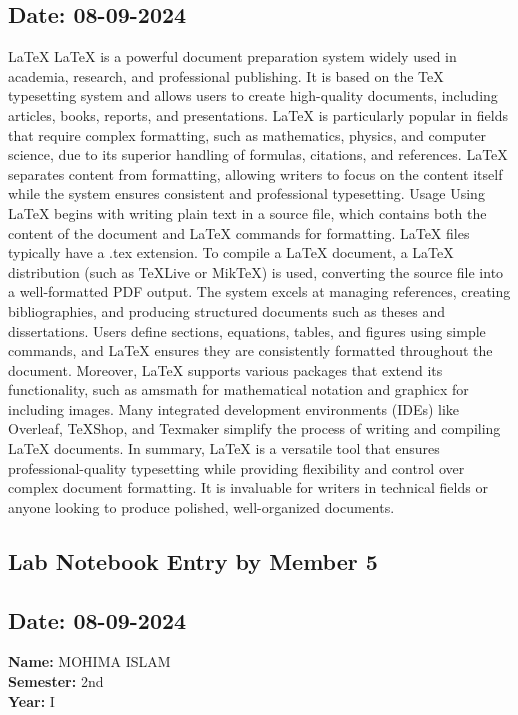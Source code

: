 \documentclass[12pt]{article}
\begin{document}
\subsection*{Date: 08-09-2024}
LaTeX
LaTeX is a powerful document preparation system widely used in academia,
research, and professional publishing. It is based on the TeX typesetting
system and allows users to create high-quality documents, including articles,
books, reports, and presentations. LaTeX is particularly popular in fields
that require complex formatting, such as mathematics, physics, and
computer science, due to its superior handling of formulas, citations, and
references. LaTeX separates content from formatting, allowing writers to
focus on the content itself while the system ensures consistent and
professional typesetting.
Usage
Using LaTeX begins with writing plain text in a source file, which contains
both the content of the document and LaTeX commands for formatting.
LaTeX files typically have a .tex extension. To compile a LaTeX document,
a LaTeX distribution (such as TeXLive or MikTeX) is used, converting the
source file into a well-formatted PDF output.
The system excels at managing references, creating bibliographies, and
producing structured documents such as theses and dissertations. Users
define sections, equations, tables, and figures using simple commands, and
LaTeX ensures they are consistently formatted throughout the document.
Moreover, LaTeX supports various packages that extend its functionality,
such as amsmath for mathematical notation and graphicx for including
images. Many integrated development environments (IDEs) like Overleaf,
TeXShop, and Texmaker simplify the process of writing and compiling
LaTeX documents.
In summary, LaTeX is a versatile tool that ensures professional-quality
typesetting while providing flexibility and control over complex document
formatting. It is invaluable for writers in technical fields or anyone looking
to produce polished, well-organized documents.
\newpage


\subsection*{Lab Notebook Entry by Member 5}
\subsection*{Date: 08-09-2024}

\begin{flushright}
\textbf{Name:} MOHIMA ISLAM \\
\textbf{Semester:} 2nd \\
\textbf{Year:} I \\
\end{flushright}
\end{document}
